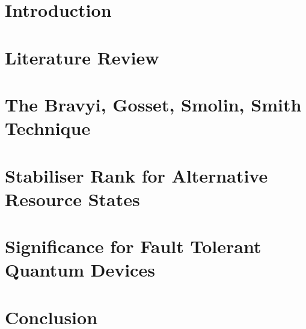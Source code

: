 \documentclass[11pt,a4paper,twoside]{report}
\theoremstyle{plain}%
\theoremstyle{definition}
\theoremstyle{remark}
\begin{document}

\restoregeometry 
\pagestyle{fancy}  %
\fancyhead{} %
\fancyhead[RO,LE]{\thepage} %
\fancyhead[LO]{\slshape\rightmark}
\cfoot{}
\makeatletter
\renewcommand{\chaptermark}[1]{%
  \markboth{}{\MakeUppercase{%
    \ifnum\c@secnumdepth>\m@ne \thechapter. \ \fi #1}}%
}
\makeatother
\begin{abstract}
   
\end{abstract}
\tableofcontents
\pagebreak
\chapter{Introduction}\label{chap:intro}

\chapter{Literature Review}\label{chap:litreview}

\chapter{The Bravyi, Gosset, Smolin, Smith Technique}\label{chap:bssg}

\chapter{Stabiliser Rank for Alternative Resource States}\label{chap:results}

\chapter{Significance for Fault Tolerant Quantum Devices}\label{chap:discussion}

\chapter*{Conclusion}\label{chap:conclusion}



\end{document}
